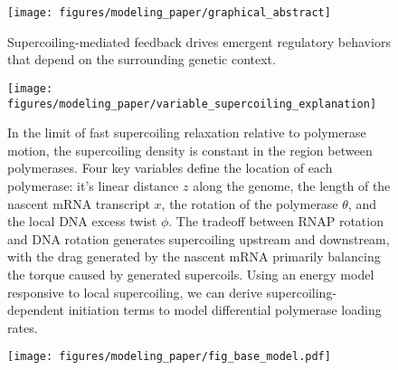 \documentclass[11pt]{article}
\begin{document}
\begin{figure}[h]
    \centering
    \texttt{[image: figures/modeling\_paper/graphical\_abstract]}
    \caption{Supercoiling-mediated feedback drives emergent regulatory behaviors that depend on the surrounding genetic context.} \label{fig:graphical_abstract}
\end{figure}
\begin{figure}[h]
    \centering
    \texttt{[image: figures/modeling\_paper/variable\_supercoiling\_explanation]}
    \caption{In the limit of fast supercoiling relaxation relative to polymerase motion, the supercoiling density is constant in the region between polymerases. Four key variables define the location of each polymerase: it's linear distance \(z\) along the genome, the length of the nascent mRNA transcript \(x\), the rotation of the polymerase \(\theta\), and the local DNA excess twist \(\phi\). The tradeoff between RNAP rotation and DNA rotation generates supercoiling upstream and downstream, with the drag generated by the nascent mRNA primarily balancing the torque caused by generated supercoils. Using an energy model responsive to local supercoiling, we can derive supercoiling-dependent initiation terms to model differential polymerase loading rates.}
    \label{fig:key_variables_diagram}
\end{figure}
\begin{figure}[h]
    \centering
    {\texttt{[image: figures/modeling\_paper/fig\_base\_model.pdf]}
    \label{fig:base_orientations}
    \label{fig:linear_bc_distributions}
    \label{fig:circular_bc_distributions}
    \label{fig:linear_fold_induction}
    \label{fig:circular_fold_induction}
    \label{fig:intergene_spacing_cartoon}
    \label{fig:reporter_output_by_spacing_fold_induction}}
    \label{fig:base_model_sc_density}
\end{figure}
\end{document}
